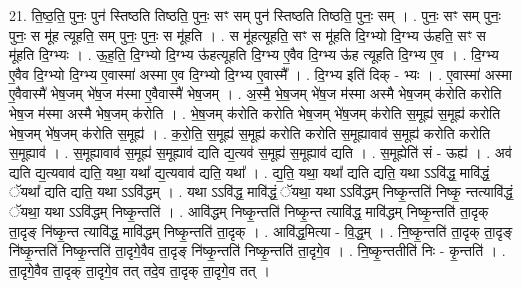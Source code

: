 \documentclass[17pt]{extarticle}
\begin{document}
21. ति॒ष्ठ॒ति॒ पुनः॒ पुन॑ स्तिष्ठति तिष्ठति॒ पुनः॒ सꣳ सम् पुन॑ स्तिष्ठति तिष्ठति॒ पुनः॒ सम् । . पुनः॒ सꣳ सम् पुनः॒ पुनः॒ स मू॑ह त्यूहति॒ सम् पुनः॒ पुनः॒ स मू॑हति । . स मू॑हत्यूहति॒ सꣳ स मू॑हति दि॒ग्भ्यो दि॒ग्भ्य ऊ॑हति॒ सꣳ स मू॑हति दि॒ग्भ्यः । . ऊ॒ह॒ति॒ दि॒ग्भ्यो दि॒ग्भ्य ऊ॑हत्यूहति दि॒ग्भ्य ए॒वैव दि॒ग्भ्य ऊ॑ह त्यूहति दि॒ग्भ्य ए॒व । . दि॒ग्भ्य ए॒वैव दि॒ग्भ्यो दि॒ग्भ्य ए॒वास्मा॑ अस्मा ए॒व दि॒ग्भ्यो दि॒ग्भ्य ए॒वास्मै᳚ । . दि॒ग्भ्य इति॑ दिक् - भ्यः । . ए॒वास्मा॑ अस्मा ए॒वैवास्मै॑ भेष॒जम् भे॑ष॒ज म॑स्मा ए॒वैवास्मै॑ भेष॒जम् । . अ॒स्मै॒ भे॒ष॒जम् भे॑ष॒ज म॑स्मा अस्मै भेष॒जम् क॑रोति करोति भेष॒ज म॑स्मा अस्मै भेष॒जम् क॑रोति । . भे॒ष॒जम् क॑रोति करोति भेष॒जम् भे॑ष॒जम् क॑रोति स॒मूह्य॑ स॒मूह्य॑ करोति भेष॒जम् भे॑ष॒जम् क॑रोति स॒मूह्य॑ । . क॒रो॒ति॒ स॒मूह्य॑ स॒मूह्य॑ करोति करोति स॒मूह्यावाव॑ स॒मूह्य॑ करोति करोति स॒मूह्याव॑ । . स॒मूह्यावाव॑ स॒मूह्य॑ स॒मूह्याव॑ द्यति द्य॒त्यव॑ स॒मूह्य॑ स॒मूह्याव॑ द्यति । . स॒मूह्येति॑ सं - ऊह्य॑ । . अव॑ द्यति द्य॒त्यवाव॑ द्यति॒ यथा॒ यथा᳚ द्य॒त्यवाव॑ द्यति॒ यथा᳚ । . द्य॒ति॒ यथा॒ यथा᳚ द्यति द्यति॒ यथा ऽऽवि॑द्ध॒ मावि॑द्धं॒ ॅयथा᳚ द्यति द्यति॒ यथा ऽऽवि॑द्धम् । . यथा ऽऽवि॑द्ध॒ मावि॑द्धं॒ ॅयथा॒ यथा ऽऽवि॑द्धम् निष्कृ॒न्तति॑ निष्कृ॒ न्तत्यावि॑द्धं॒ ॅयथा॒ यथा ऽऽवि॑द्धम् निष्कृ॒न्तति॑ । . आवि॑द्धम् निष्कृ॒न्तति॑ निष्कृ॒न्त त्यावि॑द्ध॒ मावि॑द्धम् निष्कृ॒न्तति॑ ता॒दृक् ता॒दृङ् नि॑ष्कृ॒न्त त्यावि॑द्ध॒ मावि॑द्धम् निष्कृ॒न्तति॑ ता॒दृक् । . आवि॑द्ध॒मित्या - वि॒द्ध॒म् । . नि॒ष्कृ॒न्तति॑ ता॒दृक् ता॒दृङ् नि॑ष्कृ॒न्तति॑ निष्कृ॒न्तति॑ ता॒दृगे॒वैव ता॒दृङ् नि॑ष्कृ॒न्तति॑ निष्कृ॒न्तति॑ ता॒दृगे॒व । . नि॒ष्कृ॒न्ततीति॑ निः - कृ॒न्तति॑ । . ता॒दृगे॒वैव ता॒दृक् ता॒दृगे॒व तत् तदे॒व ता॒दृक् ता॒दृगे॒व तत् । \newline
\end{document}
